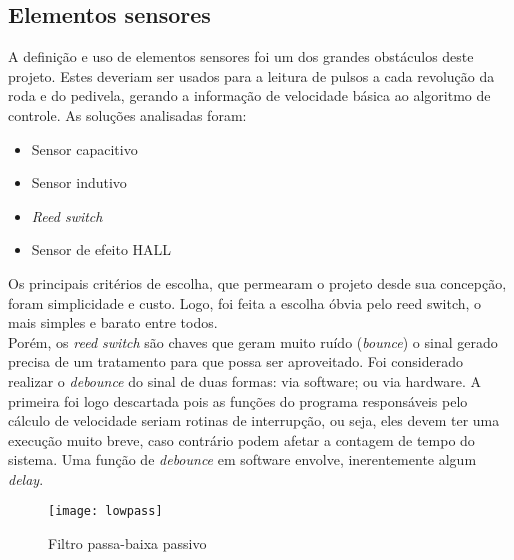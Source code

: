 \documentclass[a4paper,11pt]{article}
\begin{document}
\subsection{Elementos sensores}
\label{sensores}
A definição e uso de elementos sensores foi um dos grandes obstáculos deste projeto. Estes deveriam ser usados para a leitura de pulsos a cada revolução da roda e do pedivela, gerando a informação de velocidade básica ao algoritmo de controle. As soluções analisadas foram:
\begin{itemize}
 \item Sensor capacitivo
 \item Sensor indutivo
 \item \textit{Reed switch}
 \item Sensor de efeito HALL
\end{itemize}
Os principais critérios de escolha, que permearam o projeto desde sua concepção, foram simplicidade e custo.
Logo, foi feita a escolha óbvia pelo reed switch, o mais simples e barato entre todos. \\
Porém, os \textit{reed switch} são chaves que geram muito ruído (\textit{bounce}) o sinal gerado precisa de um tratamento para que possa ser aproveitado. Foi considerado realizar o \textit{debounce} do sinal de duas formas: via software; ou via hardware. A primeira foi logo descartada pois as funções do programa responsáveis pelo cálculo de velocidade seriam rotinas de interrupção, ou seja, eles devem ter uma execução muito breve, caso contrário podem afetar a contagem de tempo do sistema. Uma função de \textit{debounce} em software envolve, inerentemente algum \textit{delay}.\\

\begin{figure}[ht]
 \begin{center}
  \texttt{[image: lowpass]}
 \end{center}
 \caption{Filtro passa-baixa passivo}
 \label{fig:lowpass}
\end{figure}
\end{document}
